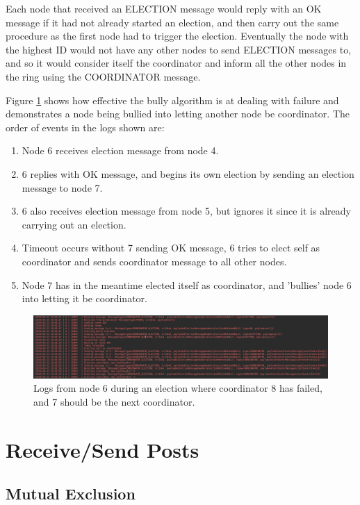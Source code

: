 \documentclass[12pt]{article}
\begin{document}
Each node that received an ELECTION message would reply with an OK message if it had not already started an election, and then carry out the same procedure as the first node had to trigger the election. Eventually the node with the highest ID would not have any other nodes to send ELECTION messages to, and so it would consider itself the coordinator and inform all the other nodes in the ring using the COORDINATOR message.

Figure \ref{fig:bully} shows how effective the bully algorithm is at dealing with failure and demonstrates a node being bullied into letting another node be coordinator. The order of events in the logs shown are:

\begin{enumerate}
	\item Node 6 receives election message from node 4.
	\item 6 replies with OK message, and begins its own election by sending an election message to node 7.
	\item 6 also receives election message from node 5, but ignores it since it is already carrying out an election.
	\item Timeout occurs without 7 sending OK message, 6 tries to elect self as coordinator and sends coordinator message to all other nodes.
	\item Node 7 has in the meantime elected itself as coordinator, and 'bullies' node 6 into letting it be coordinator.
\end{enumerate}

\begin{figure}[!ht]
	\centering
	\includegraphics[width=\linewidth]{images/bully}
	\caption{Logs from node 6 during an election where coordinator 8 has failed, and 7 should be the next coordinator.}
	\label{fig:bully}
\end{figure}

\section{Receive/Send Posts}

\subsection{Mutual Exclusion}
\end{document}
